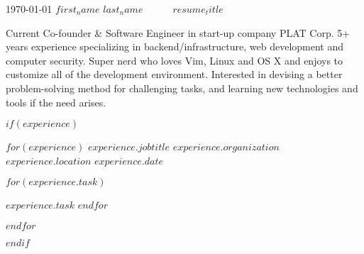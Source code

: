 \documentclass[11pt, a4paper]{awesome-cv}
\begin{document}
\makecvheader[C]

\makecvfooter
  {\today}
  {$first_name$ $last_name$~~~\textperiodcentered~~~$resume_title$}
  {\thepage}




\begin{cvparagraph}
  Current Co-founder \& Software Engineer in start-up company PLAT Corp. 5+ years experience specializing in backend/infrastructure, web development and computer security. Super nerd who loves Vim, Linux and OS X and enjoys to customize all of the development environment. Interested in devising a better problem-solving method for challenging tasks, and learning new technologies and tools if the need arises.
\end{cvparagraph}


$if(experience)$

\begin{cventries}
  $for(experience)$
  \cventry
  {$experience.jobtitle$}
  {$experience.organization$}
  {$experience.location$}
  {$experience.date$}
  {
  \begin{cvitems}
    $for(experience.task)$
    \item {$experience.task$}
    $endfor$
  \end{cvitems}
  }
  $endfor$
\end{cventries}
$endif$

\end{document}
